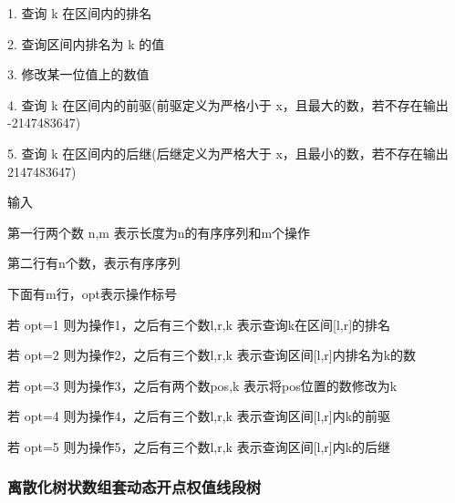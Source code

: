 \documentclass[UTF8]{ctexart}
\begin{document}
1. 查询 k 在区间内的排名

2. 查询区间内排名为 k 的值

3. 修改某一位值上的数值

4. 查询 k 在区间内的前驱(前驱定义为严格小于 x，且最大的数，若不存在输出 -2147483647)

5. 查询 k 在区间内的后继(后继定义为严格大于 x，且最小的数，若不存在输出 2147483647)

输入

第一行两个数 n,m 表示长度为n的有序序列和m个操作

第二行有n个数，表示有序序列

下面有m行，opt表示操作标号

若 opt=1 则为操作1，之后有三个数l,r,k 表示查询k在区间[l,r]的排名

若 opt=2 则为操作2，之后有三个数l,r,k 表示查询区间[l,r]内排名为k的数

若 opt=3 则为操作3，之后有两个数pos,k 表示将pos位置的数修改为k

若 opt=4 则为操作4，之后有三个数l,r,k 表示查询区间[l,r]内k的前驱

若 opt=5 则为操作5，之后有三个数l,r,k 表示查询区间[l,r]内k的后继


\subsubsection{离散化树状数组套动态开点权值线段树}
\end{document}
